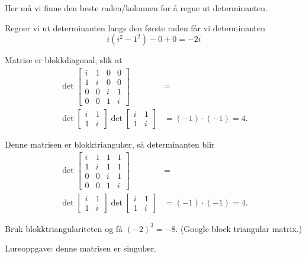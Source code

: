 \begin{losning}
	Her må vi finne den beste raden/kolonnen for å regne ut determinanten.
	\begin{punkt}	%
		Regner vi ut determinanten langs den første raden får vi determinanten
		\begin{equation*}
			i(i^2 - 1^2)  - 0 + 0 = -2i
		\end{equation*}
	\end{punkt}
	\begin{punkt}	%
Matrise er blokkdiagonal, slik at 
\begin{align*}
\det
\begin{bmatrix}
i & 1 & 0 & 0 \\ 1 & i & 0 & 0 \\ 0 & 0 & i & 1 \\ 0 & 0& 1  &i  
\end{bmatrix}
&= \\
\det
\begin{bmatrix}
i & 1  \\ 1 & i 
\end{bmatrix}
\det
\begin{bmatrix}
i & 1  \\ 1 & i 
\end{bmatrix}
&=
(-1)\cdot (-1)=4.
\end{align*}


	\end{punkt}

	\begin{punkt}
Denne matrisen er blokktriangulær, så determinanten blir 
\begin{align*}
\det
\begin{bmatrix}
i & 1 & 1 & 1  \\ 1 & i & 1 & 1 \\ 0 & 0 & i & 1 \\ 0 & 0& 1  &i 
\end{bmatrix}
&= \\
\det
\begin{bmatrix}
i & 1  \\ 1 & i 
\end{bmatrix}
\det
\begin{bmatrix}
i & 1  \\ 1 & i 
\end{bmatrix}
&=
(-1)\cdot (-1)=4.
\end{align*}
	\end{punkt}
	\begin{punkt}
	Bruk blokktriangulariteten og få $(-2)^3=-8$. (Google block triangular matrix.)
	\end{punkt}
	\begin{punkt}
Lureoppgave: denne matrisen er singulær.
	\end{punkt}
\end{losning}

